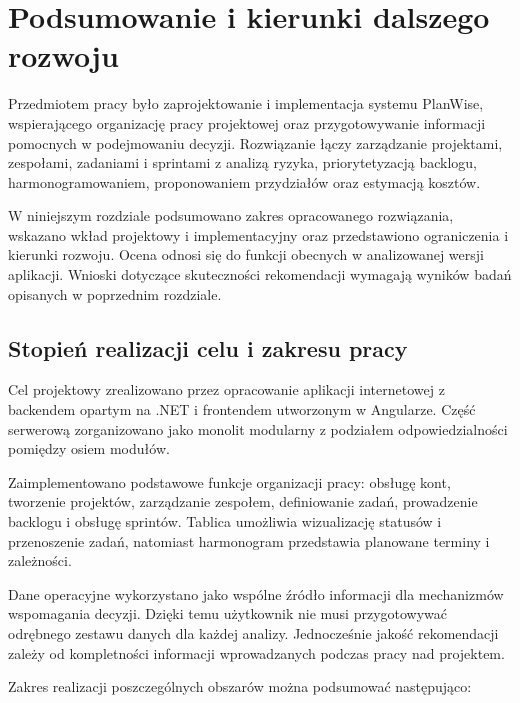\chapter{Podsumowanie i kierunki dalszego rozwoju}
\label{chap:podsumowanie}

Przedmiotem pracy było zaprojektowanie i implementacja systemu PlanWise, wspierającego organizację pracy projektowej oraz przygotowywanie informacji pomocnych w podejmowaniu decyzji. Rozwiązanie łączy zarządzanie projektami, zespołami, zadaniami i sprintami z analizą ryzyka, priorytetyzacją backlogu, harmonogramowaniem, proponowaniem przydziałów oraz estymacją kosztów.

W niniejszym rozdziale podsumowano zakres opracowanego rozwiązania, wskazano wkład projektowy i implementacyjny oraz przedstawiono ograniczenia i kierunki rozwoju. Ocena odnosi się do funkcji obecnych w analizowanej wersji aplikacji. Wnioski dotyczące skuteczności rekomendacji wymagają wyników badań opisanych w poprzednim rozdziale.

\section{Stopień realizacji celu i zakresu pracy}

Cel projektowy zrealizowano przez opracowanie aplikacji internetowej z backendem opartym na .NET i frontendem utworzonym w Angularze. Część serwerową zorganizowano jako monolit modularny z podziałem odpowiedzialności pomiędzy osiem modułów.

Zaimplementowano podstawowe funkcje organizacji pracy: obsługę kont, tworzenie projektów, zarządzanie zespołem, definiowanie zadań, prowadzenie backlogu i obsługę sprintów. Tablica umożliwia wizualizację statusów i przenoszenie zadań, natomiast harmonogram przedstawia planowane terminy i zależności.

Dane operacyjne wykorzystano jako wspólne źródło informacji dla mechanizmów wspomagania decyzji. Dzięki temu użytkownik nie musi przygotowywać odrębnego zestawu danych dla każdej analizy. Jednocześnie jakość rekomendacji zależy od kompletności informacji wprowadzanych podczas pracy nad projektem.

Zakres realizacji poszczególnych obszarów można podsumować następująco:

